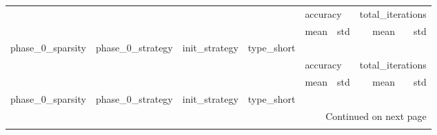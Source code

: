 \begin{longtable}{llllrrrr}
\toprule
      &     &         &    & \multicolumn{2}{l}{accuracy} & \multicolumn{2}{l}{total\_iterations} \\
      &     &         &    &       mean &        std &             mean &           std \\
phase\_0\_sparsity & phase\_0\_strategy & init\_strategy & type\_short &            &            &                  &               \\
\midrule
\endfirsthead

\toprule
      &     &         &    & \multicolumn{2}{l}{accuracy} & \multicolumn{2}{l}{total\_iterations} \\
      &     &         &    &       mean &        std &             mean &           std \\
phase\_0\_sparsity & phase\_0\_strategy & init\_strategy & type\_short &            &            &                  &               \\
\midrule
\endhead
\midrule
\multicolumn{8}{r}{{Continued on next page}} \\
\midrule
\endfoot


\end{longtable}
